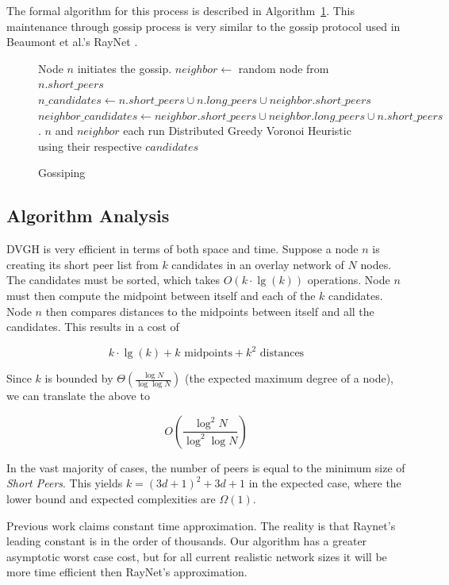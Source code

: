 The formal algorithm for this process is described in Algorithm~\ref{alg:gossip}.
This maintenance through gossip process is very similar to the gossip protocol used in Beaumont et al.'s RayNet \cite{raynet}.


\begin{figure}
\caption{Gossiping}
\label{alg:gossip}
\begin{algorithmic}[1]  %
	\State Node $n$ initiates the gossip.
	\State $neighbor \leftarrow$ random node from $n.short\_peers$
   \State $n\_candidates \leftarrow n.short\_peers \cup n.long\_peers \cup neighbor.short\_peers$
   \State $neighbor\_candidates \leftarrow neighbor.short\_peers \cup neighbor.long\_peers \cup n.short\_peers$.  
   \State $n$ and $neighbor$ each run Distributed Greedy Voronoi Heuristic using their respective $candidates$
\end{algorithmic} 
\end{figure}






\subsection{Algorithm Analysis}

DVGH is very efficient in terms of both space and time.
Suppose a node $n$ is creating its short peer list from $k$ candidates in an overlay network of $N$ nodes. 
The candidates must be sorted, which takes $O(k\cdot\lg(k))$ operations.  
Node $n$ must then compute the midpoint between itself and each of the $k$ candidates.  
Node $n$ then compares distances to the midpoints between itself and all the candidates.  
This results in a cost of 

\[ k\cdot\lg(k) + k \text{ midpoints}  + k^{2} \text{ distances} \]


Since $k$ is  bounded by $\Theta(\frac{\log N}{\log \log N} )$ \cite{bern1991expected} (the expected maximum degree of a node), we can translate the above to

\[O(\frac{\log^{2} N}{\log^{2} \log N} )\]

In the vast majority of cases, the number of peers is equal to the minimum size of \textit{Short Peers}. 
This yields $k=(3d+1)^{2}+3d+1$ in the expected case, where the lower bound and expected complexities are $\Omega(1)$.

Previous work \cite{raynet} claims constant time approximation. 
The reality is that Raynet's leading constant is in the order of thousands. %
Our algorithm has a greater asymptotic worst case cost, but for all current realistic network sizes it will be more time efficient then RayNet's approximation.





